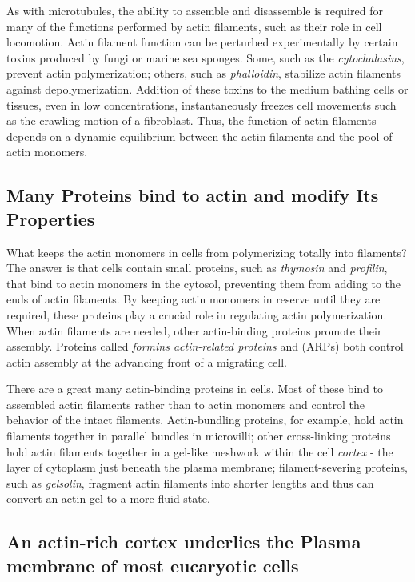 As with microtubules, the ability to assemble and disassemble is required
for many of the functions performed by actin filaments, such as their role
in cell locomotion. Actin filament function can be perturbed experimentally
by certain toxins produced by fungi or marine sea sponges. Some,
such as the \textit{cytochalasins}, prevent actin polymerization; others, such as
\textit{phalloidin}, stabilize actin filaments against depolymerization.
Addition of these toxins to the medium bathing cells or
tissues, even in low concentrations, instantaneously freezes cell movements
such as the crawling motion of a fibroblast. Thus, the function of
actin filaments depends on a dynamic equilibrium between the actin filaments
and the pool of actin monomers.

\subsection{Many Proteins bind to actin and modify Its Properties}

What keeps the actin monomers in cells from polymerizing totally into filaments? The answer is that cells
contain small proteins, such as \textit{thymosin} and \textit{profilin}, that bind to actin
monomers in the cytosol, preventing them from adding to the ends of
actin filaments. By keeping actin monomers in reserve until they are
required, these proteins play a crucial role in regulating actin polymerization.
When actin filaments are needed, other actin-binding proteins
promote their assembly. Proteins called \textit{formins actin-related proteins} and
(ARPs) both control actin assembly at the advancing front of a migrating
cell.

There are a great many actin-binding proteins in cells. Most of these bind
to assembled actin filaments rather than to actin monomers and control
the behavior of the intact filaments. Actin-bundling proteins,
for example, hold actin filaments together in parallel bundles in
microvilli; other cross-linking proteins hold actin filaments together in
a gel-like meshwork within the cell \textit{cortex} - the layer of cytoplasm just
beneath the plasma membrane; filament-severing proteins, such as \textit{gelsolin},
fragment actin filaments into shorter lengths and thus can convert
an actin gel to a more fluid state.

\subsection{An actin-rich cortex underlies the Plasma membrane of most eucaryotic cells}


